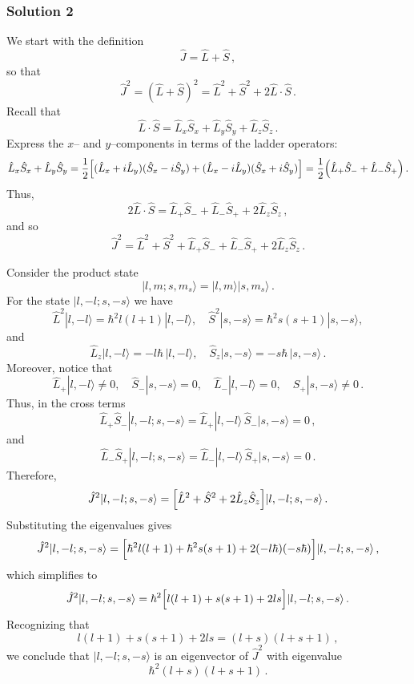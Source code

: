\documentclass{article}
\begin{document}
\subsubsection{Solution 2}
We start with the definition
\[
\hat{J}=\hat{L}+\hat{S}\,,
\]
so that
\[
\hat{J}^2=(\hat{L}+\hat{S})^2=\hat{L}^2+\hat{S}^2+2\hat{L}\cdot\hat{S}\,.
\]
Recall that
\[
\hat{L}\cdot\hat{S}=\hat{L}_x\hat{S}_x+\hat{L}_y\hat{S}_y+\hat{L}_z\hat{S}_z\,.
\]
Express the \(x\)– and \(y\)–components in terms of the ladder operators:
\[
\hat{L}_x\hat{S}_x+\hat{L}_y\hat{S}_y = \frac{1}{2}\Bigl[(\hat{L}_x+i\hat{L}_y)(\hat{S}_x-i\hat{S}_y)+(\hat{L}_x-i\hat{L}_y)(\hat{S}_x+i\hat{S}_y)\Bigr] = \frac{1}{2} \Bigl(\hat{L}_+\hat{S}_-+\hat{L}_-\hat{S}_+\Bigr)\,.
\]
Thus,
\[
2\hat{L}\cdot\hat{S} = \hat{L}_+\hat{S}_-+\hat{L}_-\hat{S}_+ + 2\hat{L}_z\hat{S}_z\,,
\]
and so
\[
\hat{J}^2 = \hat{L}^2 + \hat{S}^2 + \hat{L}_+\hat{S}_- + \hat{L}_-\hat{S}_+ + 2\hat{L}_z\hat{S}_z\,.
\]

Consider the product state
\[
|l,m;s,m_s\rangle = |l,m\rangle|s,m_s\rangle\,.
\]
For the state \(|l,-l;s,-s\rangle\) we have
\[
\hat{L}^2|l,-l\rangle = \hbar^2 l(l+1)|l,-l\rangle,\quad \hat{S}^2|s,-s\rangle = \hbar^2 s(s+1)|s,-s\rangle,
\]
and
\[
\hat{L}_z|l,-l\rangle = -l\hbar\,|l,-l\rangle,\quad \hat{S}_z|s,-s\rangle = -s\hbar\,|s,-s\rangle\,.
\]
Moreover, notice that
\[
\hat{L}_+|l,-l\rangle \neq 0,\quad \hat{S}_-|s,-s\rangle = 0,\quad \hat{L}_-|l,-l\rangle = 0,\quad \hat{S}_+|s,-s\rangle \neq 0\,.
\]
Thus, in the cross terms
\[
\hat{L}_+\hat{S}_-|l,-l;s,-s\rangle = \hat{L}_+|l,-l\rangle\,\hat{S}_-|s,-s\rangle = 0\,,
\]
and
\[
\hat{L}_-\hat{S}_+|l,-l;s,-s\rangle = \hat{L}_-|l,-l\rangle\,\hat{S}_+|s,-s\rangle = 0\,.
\]
Therefore,
\[
\hat{J}^2|l,-l;s,-s\rangle = \Bigl[\hat{L}^2+\hat{S}^2+2\hat{L}_z\hat{S}_z\Bigr]|l,-l;s,-s\rangle\,.
\]
Substituting the eigenvalues gives
\[
\hat{J}^2|l,-l;s,-s\rangle = \Bigl[\hbar^2 l(l+1)+\hbar^2 s(s+1)+2(-l\hbar)(-s\hbar)\Bigr]|l,-l;s,-s\rangle\,,
\]
which simplifies to
\[
\hat{J}^2|l,-l;s,-s\rangle = \hbar^2\Bigl[l(l+1)+s(s+1)+2ls\Bigr]|l,-l;s,-s\rangle\,.
\]
Recognizing that
\[
l(l+1)+s(s+1)+2ls = (l+s)(l+s+1)\,,
\]
we conclude that \(|l,-l;s,-s\rangle\) is an eigenvector of \(\hat{J}^2\) with eigenvalue
\[
\hbar^2 (l+s)(l+s+1)\,.
\]
\end{document}
